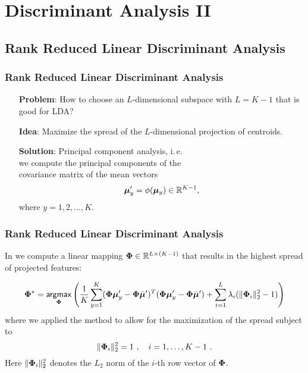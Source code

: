\section{Discriminant Analysis II}

\subsection{Rank Reduced Linear Discriminant Analysis}

\begin{frame}
	\frametitle{Rank Reduced Linear Discriminant Analysis}

	\begin{center}
		\begin{minipage}{0.8\textwidth}
			\begin{itemize}
				\item[{\bf Problem}:] How to choose an $L$-dimensional subspace with $L=K-1$ that is good for  LDA? \\[.5cm]
				\item[{\bf Idea}:] Maximize the spread of the $L$-dimensional projection of centroids. \\[.5cm]
				\item[{\bf Solution}:] Principal component analysis, i.\,e.\ \\
				      we compute the principal components of the \\
				      covariance matrix of the mean vectors
				      $${\bm \mu}'_y = \phi({\bm \mu}_y) \in \mathbb{R}^{K-1},$$
				      where $y=1,2,\dots, K$.
			\end{itemize}
		\end{minipage}
	\end{center}
\end{frame}


\begin{frame}
	\frametitle{Rank Reduced Linear Discriminant Analysis \cont}

	In  we compute a linear mapping ${\bm \Phi} \in \mathbb{R}^{L \times (K-1)}$ that
	results in the highest spread of projected features:
	\pause

	\begin{displaymath}
		{\bm \Phi}^* = \mathop{\mathsf{argmax}}_{{\bm \Phi}} \left(
		\frac{1}{K}
		\sum_{y=1}^K ({\bm \Phi}{\bm \mu}'_y - {\bm \Phi}\bar{{\bm \mu}}' )^T
		({\bm \Phi}{\bm \mu}'_y - {\bm \Phi}\bar{{\bm \mu}}' ) +
		\sum_{i=1}^{L} \lambda_i (\| {\bm \Phi}_i \|_2^2 - 1)
		\right)
	\end{displaymath}
	where we applied the  method to allow for the maximization of the spread subject to
	\begin{displaymath}
		\| {\bm \Phi}_i \|_2^2 = 1 ~, \quad i = 1, \ldots, K-1 ~.
	\end{displaymath}
	Here $\| {\bm \Phi}_i \|_2^2$ denotes the $L_2$ norm of the $i$-th row vector of ${\bm \Phi}$.
\end{frame}


